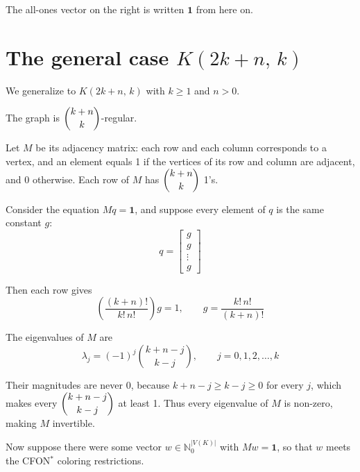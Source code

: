 \documentclass[11pt]{article}
\begin{document}
The all-ones vector on the right is written $\mathbf{1}$ from here on.

\section{The general case $K(2k+n,\,k)$}

We generalize to $K(2k+n,\,k)$ with $k \ge 1$ and $n > 0$.

The graph is $\dbinom{k+n}{k}$-regular.

Let $M$ be its adjacency matrix: each row and each column corresponds to a
vertex, and an element equals 1 if the vertices of its row and column are
adjacent, and 0 otherwise. Each row of $M$ has $\dbinom{k+n}{k}$ 1's.

Consider the equation $Mq = \mathbf{1}$, and suppose every element of $q$ is
the same constant $g$:
\[
  q = \begin{bmatrix} g \\ g \\ \vdots \\ g \end{bmatrix}
\]

Then each row gives
\[
  \left( \frac{(k+n)!}{k!\,n!} \right) g = 1,
  \qquad
  g = \frac{k!\,n!}{(k+n)!}
\]

The eigenvalues of $M$ are
\[
  \lambda_j = (-1)^j \binom{k+n-j}{k-j}, \qquad j = 0, 1, 2, \dots, k
\]

Their magnitudes are never 0, because $k+n-j \ge k-j \ge 0$ for every $j$,
which makes every $\dbinom{k+n-j}{k-j}$ at least 1. Thus every eigenvalue of
$M$ is non-zero, making $M$ invertible.

Now suppose there were some vector $w \in \mathbb{N}_0^{|V(K)|}$ with
$Mw = \mathbf{1}$, so that $w$ meets the CFON$^{*}$ coloring restrictions.
\end{document}
